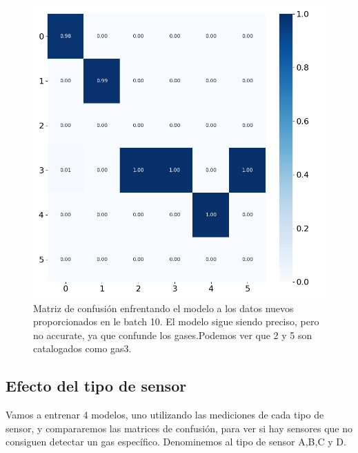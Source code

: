 \begin{figure}
	\centering
	\includegraphics[width=0.6\linewidth]{../py_imgs/Setp4_conf_matrix_test_with_batch10}
	\caption{Matriz de confusión enfrentando el modelo a los datos nuevos proporcionados en le batch 10. El modelo sigue siendo preciso, pero no accurate, ya que confunde los gases.Podemos ver que 2 y 5 son catalogados como gas3. }
	\label{fig:setp4confmatrixbatch1to9}
\end{figure}


\subsection{Efecto del tipo de sensor}

Vamos a entrenar 4 modelos, uno utilizando las mediciones de cada tipo de sensor, y compararemos las matrices de confusión, para ver si hay sensores que no consiguen detectar un gas específico. Denominemos al tipo de sensor A,B,C y D.

